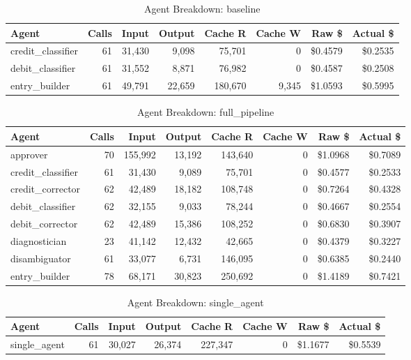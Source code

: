 \begin{table}[htbp]
\centering
\caption{Agent Breakdown: baseline}
\label{tab:agent-baseline}
\begin{tabular}{l r rr rr rr}
\toprule
Agent & Calls & Input & Output & Cache R & Cache W & Raw \$ & Actual \$ \\
\midrule
  credit\_classifier & 61 & 31,430 & 9,098 & 75,701 & 0 & \$0.4579 & \$0.2535 \\
  debit\_classifier & 61 & 31,552 & 8,871 & 76,982 & 0 & \$0.4587 & \$0.2508 \\
  entry\_builder & 61 & 49,791 & 22,659 & 180,670 & 9,345 & \$1.0593 & \$0.5995 \\
\bottomrule
\end{tabular}
\end{table}

\begin{table}[htbp]
\centering
\caption{Agent Breakdown: full\_pipeline}
\label{tab:agent-full-pipeline}
\begin{tabular}{l r rr rr rr}
\toprule
Agent & Calls & Input & Output & Cache R & Cache W & Raw \$ & Actual \$ \\
\midrule
  approver & 70 & 155,992 & 13,192 & 143,640 & 0 & \$1.0968 & \$0.7089 \\
  credit\_classifier & 61 & 31,430 & 9,089 & 75,701 & 0 & \$0.4577 & \$0.2533 \\
  credit\_corrector & 62 & 42,489 & 18,182 & 108,748 & 0 & \$0.7264 & \$0.4328 \\
  debit\_classifier & 62 & 32,155 & 9,033 & 78,244 & 0 & \$0.4667 & \$0.2554 \\
  debit\_corrector & 62 & 42,489 & 15,386 & 108,252 & 0 & \$0.6830 & \$0.3907 \\
  diagnostician & 23 & 41,142 & 12,432 & 42,665 & 0 & \$0.4379 & \$0.3227 \\
  disambiguator & 61 & 33,077 & 6,731 & 146,095 & 0 & \$0.6385 & \$0.2440 \\
  entry\_builder & 78 & 68,171 & 30,823 & 250,692 & 0 & \$1.4189 & \$0.7421 \\
\bottomrule
\end{tabular}
\end{table}

\begin{table}[htbp]
\centering
\caption{Agent Breakdown: single\_agent}
\label{tab:agent-single-agent}
\begin{tabular}{l r rr rr rr}
\toprule
Agent & Calls & Input & Output & Cache R & Cache W & Raw \$ & Actual \$ \\
\midrule
  single\_agent & 61 & 30,027 & 26,374 & 227,347 & 0 & \$1.1677 & \$0.5539 \\
\bottomrule
\end{tabular}
\end{table}


